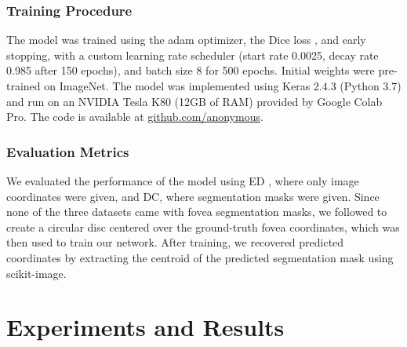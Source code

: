 \documentclass[hidelinks,runningheads]{llncs}
\begin{document}
\subsubsection{Training Procedure}
The model was trained using the adam optimizer, the Dice loss \cite{sudre_generalised_2017}, and early stopping, with a custom learning rate scheduler (start rate 0.0025, decay rate 0.985 after 150 epochs), and batch size 8 for 500 epochs.
Initial weights were pre-trained on ImageNet.
The model was implemented using Keras 2.4.3 (Python 3.7) and run on an NVIDIA Tesla K80 (12GB of RAM) provided by Google Colab Pro.
The code is available at \url{github.com/anonymous}.


\subsubsection{Evaluation Metrics}

We evaluated the performance of the model using \ac{ED} \cite{meyer_pixel-wise_2018}, where only image coordinates were given, and \ac{DC}, where segmentation masks were given.
Since none of the three datasets came with fovea segmentation masks, we followed \cite{meyer_pixel-wise_2018} to create a circular disc centered over the ground-truth fovea coordinates, which was then used to train our network.
After training, we recovered predicted coordinates by extracting the centroid of the predicted segmentation mask using scikit-image.










\section{Experiments and Results}
\end{document}
